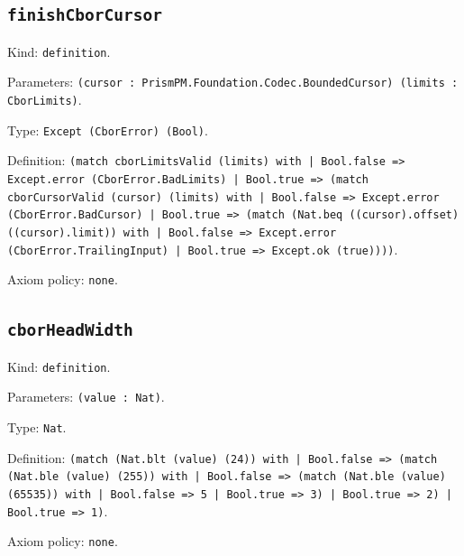 \documentclass[11pt]{article}
\begin{document}
\subsection*{\texttt{finishCborCursor}}
\noindent Kind: \texttt{definition}.\par
\noindent Parameters: \texttt{(cursor : PrismPM.Foundation.Codec.BoundedCursor) (limits : CborLimits)}.\par
\noindent Type: \texttt{Except (CborError) (Bool)}.\par
\noindent Definition: \texttt{(match cborLimitsValid (limits) with | Bool.false => Except.error (CborError.BadLimits) | Bool.true => (match cborCursorValid (cursor) (limits) with | Bool.false => Except.error (CborError.BadCursor) | Bool.true => (match (Nat.beq ((cursor).offset) ((cursor).limit)) with | Bool.false => Except.error (CborError.TrailingInput) | Bool.true => Except.ok (true))))}.\par
\noindent Axiom policy: \texttt{none}.\par
\subsection*{\texttt{cborHeadWidth}}
\noindent Kind: \texttt{definition}.\par
\noindent Parameters: \texttt{(value : Nat)}.\par
\noindent Type: \texttt{Nat}.\par
\noindent Definition: \texttt{(match (Nat.blt (value) (24)) with | Bool.false => (match (Nat.ble (value) (255)) with | Bool.false => (match (Nat.ble (value) (65535)) with | Bool.false => 5 | Bool.true => 3) | Bool.true => 2) | Bool.true => 1)}.\par
\noindent Axiom policy: \texttt{none}.\par
\end{document}

